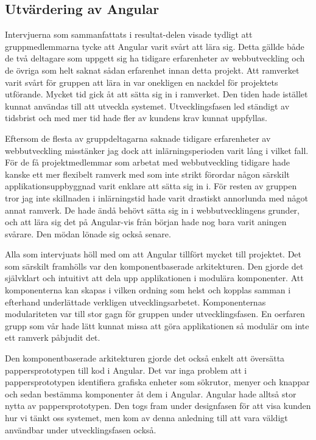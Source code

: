 \subsection{Utvärdering av Angular}

Intervjuerna som sammanfattats i resultat-delen visade tydligt att gruppmedlemmarna tycke att Angular varit svårt att lära sig. Detta gällde både de två deltagare som uppgett sig ha tidigare erfarenheter av webbutveckling och de övriga som helt saknat sådan erfarenhet innan detta projekt. Att ramverket varit svårt för gruppen att lära in var onekligen en nackdel för projektets utförande. Mycket tid gick åt att sätta sig in i ramverket. Den tiden hade istället kunnat användas till att utveckla systemet. Utvecklingsfasen led ständigt av tidsbrist och med mer tid hade fler av kundens krav kunnat uppfyllas.

Eftersom de flesta av gruppdeltagarna saknade tidigare erfarenheter av webbutveckling misstänker jag dock att inlärningsperioden varit lång i vilket fall. För de få projektmedlemmar som arbetat med webbutveckling tidigare hade kanske ett mer flexibelt ramverk med som inte strikt förordar någon särskilt applikationsuppbyggnad varit enklare att sätta sig in i. För resten av gruppen tror jag inte skillnaden i inlärningstid hade varit drastiskt annorlunda med något annat ramverk. De hade ändå behövt sätta sig in i webbutvecklingens grunder, och att lära sig det på Angular-vis från början hade nog bara varit aningen svårare. Den mödan lönade sig också senare.

Alla som intervjuats höll med om att Angular tillfört mycket till projektet. Det som särskilt framhölls var den komponentbaserade arkitekturen. Den gjorde det självklart och intuitivt att dela upp applikationen i modulära komponenter. Att komponenterna kan skapas i vilken ordning som helst och kopplas samman i efterhand underlättade verkligen utvecklingsarbetet. Komponenternas modulariteten var till stor gagn för gruppen under utvecklingsfasen. En oerfaren grupp som vår hade lätt kunnat missa att göra applikationen så modulär om inte ett ramverk påbjudit det.

Den komponentbaserade arkitekturen gjorde det också enkelt att översätta pappersprototypen till kod i Angular. Det var inga problem att i pappersprototypen identifiera grafiska enheter som sökrutor, menyer och knappar och sedan bestämma komponenter åt dem i Angular. Angular hade alltså stor nytta av pappersprototypen. Den togs fram under designfasen för att visa kunden hur vi tänkt oss systemet, men kom av denna anledning till att vara väldigt användbar under utvecklingsfasen också.

